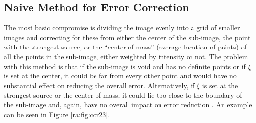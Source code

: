 \subsection{Naive Method for Error Correction}
The most basic compromise is dividing the image evenly into a grid of smaller images and correcting for these from either the center of the sub-image, the point with the strongest source, or the ``center of mass'' (average location of points) of all the points in the sub-image, either weighted by intensity or not. The problem with this method is that if the sub-image is void and has no definite points or if $\xi$ is set at the center, it could be far from every other point and would have no substantial effect on reducing the overall error. Alternatively, if $\xi$ is set at the strongest source or the center of mass, it could lie too close to the boundary of the sub-image and, again, have no overall impact on error reduction \citep{tasse2016tessellation}. An example can be seen in Figure \ref{ra:fig:cor23}.



